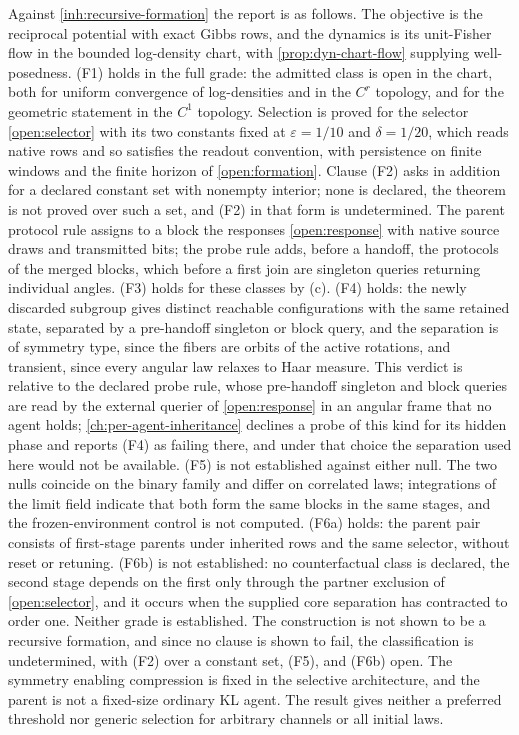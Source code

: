 Against \cref{inh:recursive-formation} the report is as follows. The objective is the reciprocal potential with exact Gibbs rows, and the dynamics is its unit-Fisher flow in the bounded log-density chart, with \cref{prop:dyn-chart-flow} supplying well-posedness. (F1) holds in the full grade: the admitted class is open in the chart, both for uniform convergence of log-densities and in the $C^r$ topology, and for the geometric statement in the $C^1$ topology. Selection is proved for the selector \cref{open:selector} with its two constants fixed at $\varepsilon=1/10$ and $\delta=1/20$, which reads native rows and so satisfies the readout convention, with persistence on finite windows and the finite horizon of \cref{open:formation}. Clause (F2) asks in addition for a declared constant set with nonempty interior; none is declared, the theorem is not proved over such a set, and (F2) in that form is undetermined. The parent protocol rule assigns to a block the responses \cref{open:response} with native source draws and transmitted bits; the probe rule adds, before a handoff, the protocols of the merged blocks, which before a first join are singleton queries returning individual angles. (F3) holds for these classes by (c). (F4) holds: the newly discarded subgroup gives distinct reachable configurations with the same retained state, separated by a pre-handoff singleton or block query, and the separation is of symmetry type, since the fibers are orbits of the active rotations, and transient, since every angular law relaxes to Haar measure. This verdict is relative to the declared probe rule, whose pre-handoff singleton and block queries are read by the external querier of \cref{open:response} in an angular frame that no agent holds; \cref{ch:per-agent-inheritance} declines a probe of this kind for its hidden phase and reports (F4) as failing there, and under that choice the separation used here would not be available. (F5) is not established against either null. The two nulls coincide on the binary family and differ on correlated laws; integrations of the limit field indicate that both form the same blocks in the same stages, and the frozen-environment control is not computed. (F6a) holds: the parent pair consists of first-stage parents under inherited rows and the same selector, without reset or retuning. (F6b) is not established: no counterfactual class is declared, the second stage depends on the first only through the partner exclusion of \cref{open:selector}, and it occurs when the supplied core separation has contracted to order one. Neither grade is established. The construction is not shown to be a recursive formation, and since no clause is shown to fail, the classification is undetermined, with (F2) over a constant set, (F5), and (F6b) open. The symmetry enabling compression is fixed in the selective architecture, and the parent is not a fixed-size ordinary KL agent. The result gives neither a preferred threshold nor generic selection for arbitrary channels or all initial laws.

